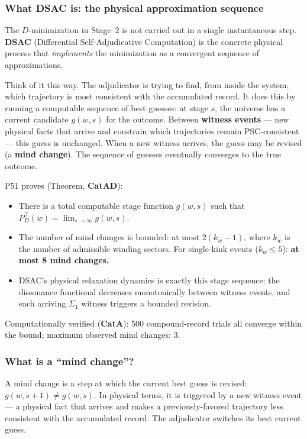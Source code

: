 \documentclass[11pt,a4paper]{article}
\newcommand{\term}[1]{\textbf{#1}}
\newcommand{\CatAD}{\textbf{CatAD}}
\newcommand{\CatA}{\textbf{CatA}}
\begin{document}
\subsubsection*{What DSAC is: the physical approximation sequence}

The $D$-minimization in Stage~2 is not carried out in a single instantaneous step.
\term{DSAC} (Differential Self-Adjudicative Computation) is the concrete physical
process that \emph{implements} the minimization as a convergent sequence of
approximations.

Think of it this way.  The adjudicator is trying to find, from inside the system,
which trajectory is most consistent with the accumulated record.  It does this by
running a computable sequence of best guesses: at stage $s$, the universe has a
current candidate $g(w, s)$ for the outcome.  Between \term{witness events} --- new
physical facts that arrive and constrain which trajectories remain PSC-consistent ---
this guess is unchanged.  When a new witness arrives, the guess may be revised (a
\term{mind change}).  The sequence of guesses eventually converges to the true outcome.

P51 proves (Theorem, \CatAD):
\begin{itemize}
  \item There is a total computable stage function $g(w,s)$ such that
    $P^\top_D(w) = \lim_{s \to \infty} g(w,s)$.
  \item The number of mind changes is bounded: at most $2(k_w - 1)$, where $k_w$
    is the number of admissible winding sectors.  For single-kink events
    ($k_w \leq 5$): \textbf{at most 8 mind changes.}
  \item DSAC's physical relaxation dynamics is exactly this stage sequence: the
    dissonance functional decreases monotonically between witness events, and each
    arriving $\Sigma_1$ witness triggers a bounded revision.
\end{itemize}

\noindent
Computationally verified (\CatA): 500 compound-record trials all converge within the
bound; maximum observed mind changes: 3.

\subsubsection*{What is a ``mind change''?}

A mind change is a step at which the current best guess is revised: $g(w, s+1) \neq g(w,s)$.
In physical terms, it is triggered by a new witness event --- a physical fact that
arrives and makes a previously-favored trajectory less consistent with the accumulated
record.  The adjudicator switches its best current guess.
\end{document}
